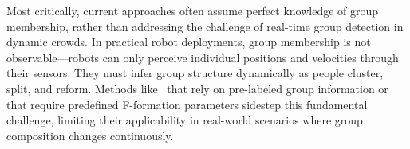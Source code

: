 Most critically, current approaches often assume perfect knowledge of group membership, rather than addressing the challenge of real-time group detection in dynamic crowds. In practical robot deployments, group membership is not observable---robots can only perceive individual positions and velocities through their sensors. They must infer group structure dynamically as people cluster, split, and reform.  Methods like~\cite{group-aware} that rely on pre-labeled group information or~\cite{tsoi2023sean} that require predefined F-formation parameters sidestep this fundamental challenge, limiting their applicability in real-world scenarios where group composition changes continuously.



